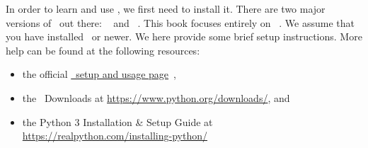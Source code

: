 %
\label{sec:installingPython}%
In order to learn and use \python, we first need to install it.
There are two major versions of \python\ out there: \python~ and \python~.
This book focuses entirely on \python~.
We assume that you have installed \pythonWithVersion\ or newer.
We here provide some brief setup instructions.
More help can be found at the following resources:%
%
\begin{itemize}%
\item the official \href{https://docs.python.org/3/using}{\python\ setup and usage page}~\cite{PSF2024PSAU},%
\item the \python\ Downloads at \url{https://www.python.org/downloads/}, and%
\item the Python 3 Installation \& Setup Guide at \url{https://realpython.com/installing-python/}%
\end{itemize}%
%
%
\FloatBarrier%
%
\FloatBarrier%
%
\endhsection%
%
